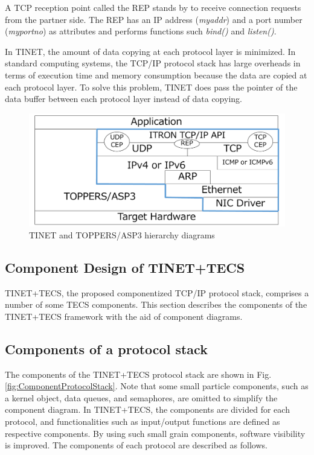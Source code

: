 \documentclass[a4j,12pt,oneside,openany,english]{jsbook}
\begin{document}
A TCP reception point called the REP stands by to receive connection requests from the partner side.
The REP has an IP address ({\it myaddr}) and a port number ({\it myportno}) as attributes and performs functions such {\it bind()} and {\it listen()}.

In TINET, the amount of data copying at each protocol layer is minimized.
In standard computing systems, the TCP/IP protocol stack has large overheads in terms of execution time and memory consumption because the data are copied at each protocol layer.
To solve this problem, TINET does pass the pointer of the data buffer between each protocol layer instead of data copying.

\begin{figure}[t]
    \centering
    \includegraphics[width=12cm,clip]{figure/TINETHierarchyDiagram.pdf}
    \caption{TINET and TOPPERS/ASP3 hierarchy diagrams}
    \label{fig:TINETHierarchyDiagram}
\end{figure}

\subsection{Component Design of TINET+TECS}

TINET+TECS, the proposed componentized TCP/IP protocol stack, comprises a number of some TECS components.
This section describes the components of the TINET+TECS framework with the aid of component diagrams.

\subsection*{Components of a protocol stack}

The components of the TINET+TECS protocol stack are shown in Fig. \ref{fig:ComponentProtocolStack}.
Note that some small particle components, such as a kernel object, data queues, and semaphores, are omitted to simplify the component diagram.
In TINET+TECS, the components are divided for each protocol, and functionalities such as input/output functions are defined as respective components.
By using such small grain components, software visibility is improved.
The components of each protocol are described as follows.
\end{document}
